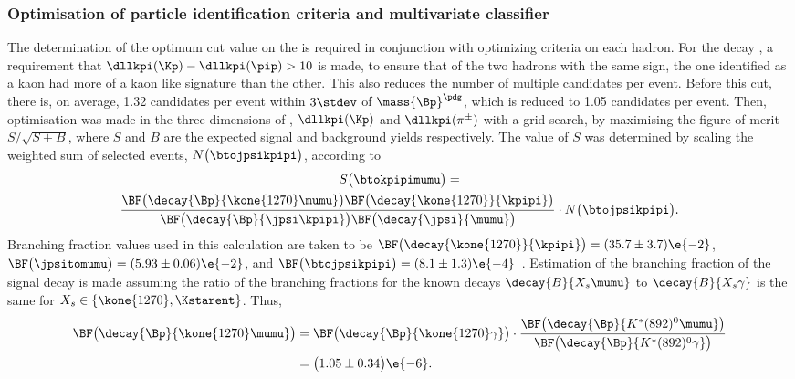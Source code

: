 \subsubsection{Optimisation of particle identification criteria and multivariate classifier}
\label{sssec:opt:kpipi}
The determination of the optimum cut value on the \BDT is required in conjunction with optimizing
\pid criteria on each hadron.
For the decay \btokpipimumu, a requirement that $\dllkpi(\Kp)-\dllkpi(\pip)>10$ is made, to
ensure that of the two hadrons with the same sign, the one identified as a kaon had more of
a kaon like signature than the other.
This also reduces the number of multiple candidates per event.
Before this cut, there is, on average, 1.32 candidates per event within $3\stdev$ of
$\mass{\Bp}^{\pdg}$, which is reduced to 1.05 candidates per event.
Then, optimisation was made in the three dimensions of \BDT, $\dllkpi(\Kp)$ and
$\dllkpi(\pi^\pm)$ with a grid search,
by maximising the figure of merit $S/\sqrt{S+B}$, where $S$ and $B$ are the expected signal and
background yields respectively.
The value of $S$ was determined by scaling the weighted sum of selected \btojpsikpipi events,
$N\big(\btojpsikpipi\big)$, according to
\begin{multline}
  S\big(\btokpipimumu\big) = \\
  \frac{
    \BF\big(\decay{\Bp}{\kone{1270}\mumu}\big)
    \BF\big(\decay{\kone{1270}}{\kpipi}\big)
  }{
    \BF\big(\decay{\Bp}{\jpsi\kpipi}\big)
    \BF\big(\decay{\jpsi}{\mumu}\big)
  }
  \cdot
  N\big(\btojpsikpipi\big).
\end{multline}
Branching fraction values used in this calculation are taken to be
$\BF\big(\decay{\kone{1270}}{\kpipi}\big) = (35.7\pm3.7)\e{-2}$,
$\BF\big(\jpsitomumu\big) = (5.93\pm0.06)\e{-2}$, and
$\BF\big(\btojpsikpipi\big) = (8.1\pm1.3)\e{-4}$~\cite{PDG2012}.
Estimation of the branching fraction of the signal decay  is made
assuming the ratio of the branching fractions for the known decays $\decay{B}{X_s\mumu}$ to
$\decay{B}{X_s\gamma}$
is the same for $X_s\in\{\kone{1270},\Kstarent\}$.
Thus,
\begin{align}
  \BF\big(\decay{\Bp}{\kone{1270}\mumu}\big)
  &=
  \BF\big(\decay{\Bp}{\kone{1270}\gamma}\big)
  \cdot\frac{
    \BF\big(\decay{\Bp}{K^*(892)^0\mumu}\big)
  }{
  \BF\big(\decay{\Bp}{K^*(892)^0\gamma}\big)
  }\nonumber\\
  &=\big(1.05\pm0.34\big)\e{-6}.
\end{align}

